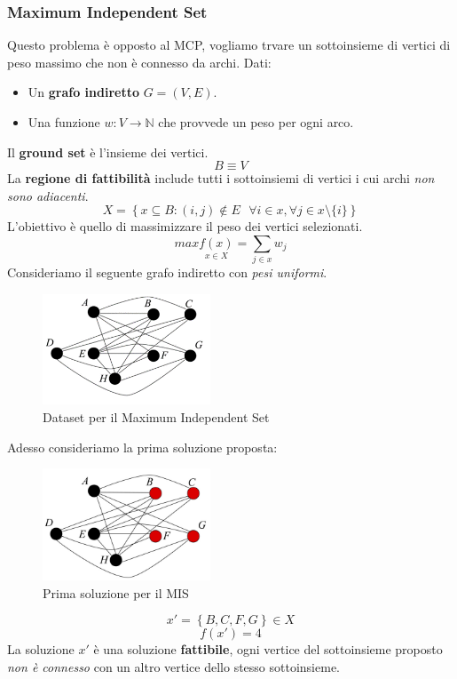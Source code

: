 \documentclass{article}
\begin{document}
\subsubsection{Maximum Independent Set}
Questo problema è opposto al MCP, vogliamo trvare un sottoinsieme di vertici di peso massimo che non è
connesso da archi.
Dati:
\begin{itemize}
    \item Un \textbf{grafo indiretto} $G=(V,E)$.
    \item Una funzione $w:V\rightarrow \mathbb{N}$ che provvede un peso per ogni arco.
\end{itemize}
Il \textbf{ground set} è l'insieme dei vertici.
$$B\equiv V$$
La \textbf{regione di fattibilità} include tutti i sottoinsiemi di vertici i cui archi \textit{non sono adiacenti}.
$$X=\left\{x\subseteq B : (i,j) \notin E \text{ }\forall i \in x, \forall j \in x\setminus \{i\}\right\}$$
L'obiettivo è quello di massimizzare il peso dei vertici selezionati.
$$max\underset{x\in X}{f(x)}=\sum_{j\in x}w_j$$
Consideriamo il seguente grafo indiretto con \textit{pesi uniformi}.
\begin{figure}[H]
    \centering
    \includegraphics[width=5cm]{images/MIS_dataset.png}
    \caption{Dataset per il Maximum Independent Set}
    \label{fig:MIS_dataset}
\end{figure}
Adesso consideriamo la prima soluzione proposta:
\begin{figure}[H]
    \centering
    \includegraphics[width=5cm]{images/MIS_sol1.png}
    \caption{Prima soluzione per il MIS}
    \label{fig:MIS_1}
\end{figure}

$$x'=\left\{B,C,F,G\right\}\in X$$
$$f(x')=4$$
La soluzione $x'$ è una soluzione \textbf{fattibile}, ogni vertice del sottoinsieme proposto \textit{non è connesso}
con un altro vertice dello stesso sottoinsieme.
\end{document}
